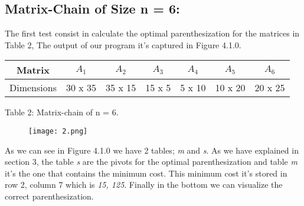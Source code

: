 \subsection{Matrix-Chain of Size n = 6:}

The first test consist in calculate the optimal parenthesization for the matrices in Table 2, The output of our program it's captured in Figure 4.1.0. \hfill \break

\begin{center}
\begin{tabular}{c c c c c c c}
\toprule
\toprule
\hspace{5px} Matrix \hspace{5px} & \hspace{20px} $A_{1}$ \hspace{20px} & \hspace{20px} $A_{2}$ \hspace{20px} & \hspace{20px} $A_{3}$ \hspace{20px} & \hspace{20px} $A_{4}$ \hspace{20px} & \hspace{20px} $A_{5}$ \hspace{20px} & \hspace{20px} $A_{6}$ \hspace{20px} \\
\toprule
\toprule
Dimensions & 30 x 35 & 35 x 15 & 15 x 5 & 5 x 10 & 10 x 20 & 20 x 25 \\
\bottomrule
\end{tabular}
\linebreak \linebreak Table 2: Matrix-chain of n = 6.
\end{center} \hfill

\begin{figure}[H]
\texttt{[image: 2.png]}
\centering \linebreak {}
\end{figure} \hfill

As we can see in Figure 4.1.0 we have 2 tables; {\itshape m} and {\itshape s}. As we have explained in section 3, the table {\itshape s} are the pivots for the optimal parenthesization and table {\itshape m} it's the one that contains the minimum cost. This minimum cost it's stored in row 2, column 7 which is {\itshape 15, 125}. Finally in the bottom we can visualize the correct parenthesization. 

